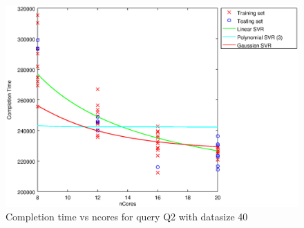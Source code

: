 
\begin {figure}[hbtp]
\centering
\includegraphics[width=\textwidth]{output/Q2_40_ALL_WITH_1_OVER_NCORES/plot_Q2_40_bestmodels.eps}
\caption{Completion time vs ncores for query Q2 with datasize 40}
\label{fig:all_linear_Q2_40}
\end {figure}
